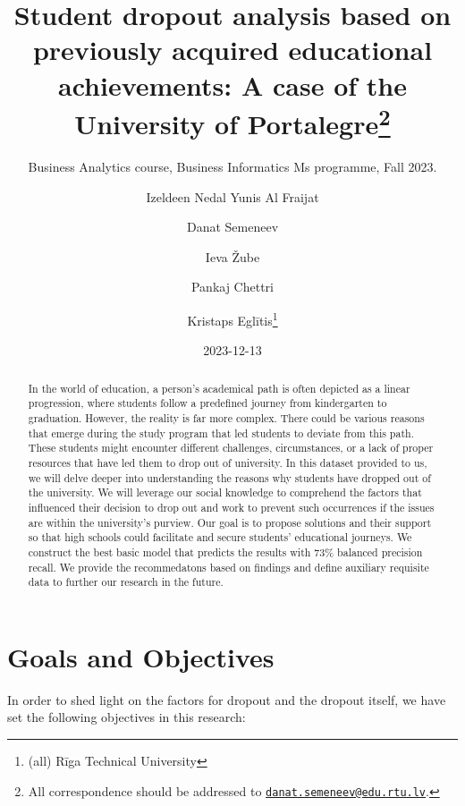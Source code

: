 \documentclass[
  letterpaper,
  DIV=11,
  numbers=noendperiod]{scrartcl}
\title{Student dropout analysis based on previously acquired educational
achievements: A case of the University of Portalegre\thanks{All
correspondence should be addressed to
\href{mailto:danat.semeneev@edu.rtu.lv}{\nolinkurl{danat.semeneev@edu.rtu.lv}}.}}
\subtitle{Business Analytics course, Business Informatics Ms programme,
Fall 2023.}
\author{Izeldeen Nedal Yunis Al Fraijat \and Danat Semeneev \and Ieva
Žube \and Pankaj Chettri \and Kristaps Eglītis\footnote{(all) Rīga
  Technical University}}
\date{2023-12-13}
\renewcommand*\contentsname{Table of contents}
\newcommand\contentsname{Table of contents}
\begin{document}
\maketitle
\begin{abstract}
In the world of education, a person's academical path is often depicted
as a linear progression, where students follow a predefined journey from
kindergarten to graduation. However, the reality is far more complex.
There could be various reasons that emerge during the study program that
led students to deviate from this path. These students might encounter
different challenges, circumstances, or a lack of proper resources that
have led them to drop out of university. In this dataset provided to us,
we will delve deeper into understanding the reasons why students have
dropped out of the university. We will leverage our social knowledge to
comprehend the factors that influenced their decision to drop out and
work to prevent such occurrences if the issues are within the
university's purview. Our goal is to propose solutions and their support
so that high schools could facilitate and secure students' educational
journeys. We construct the best basic model that predicts the results
with 73\% balanced precision recall. We provide the recommedatons based
on findings and define auxiliary requisite data to further our research
in the future.
\end{abstract}
\ifdefined\Shaded\renewenvironment{Shaded}{\begin{tcolorbox}[borderline west={3pt}{0pt}{shadecolor}, sharp corners, boxrule=0pt, breakable, interior hidden, frame hidden, enhanced]}{\end{tcolorbox}}\fi

\renewcommand*\contentsname{Table of contents}
{
\hypersetup{linkcolor=}
\setcounter{tocdepth}{3}
\tableofcontents
}

\hypertarget{goals-and-objectives}{%
\section{Goals and Objectives}\label{goals-and-objectives}}

In order to shed light on the factors for dropout and the dropout
itself, we have set the following objectives in this research:
\end{document}
